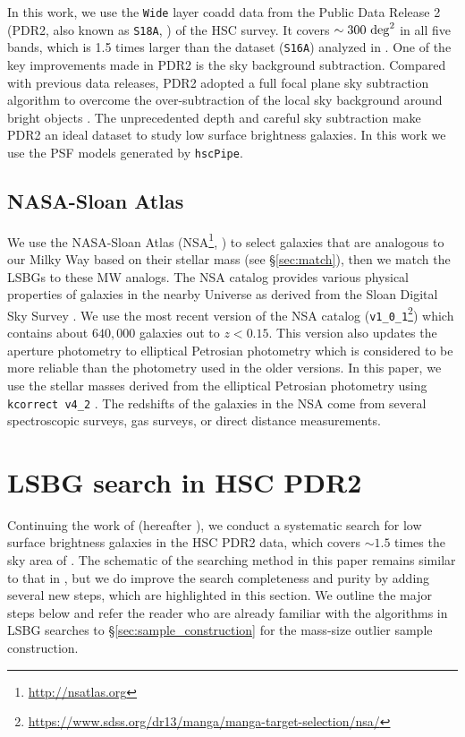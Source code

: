 \documentclass[twocolumn,astrosymb,twocolappendix]{aastex631}
\newcommand{\code}[1]{\texttt{#1}}
\begin{document}
\begin{CJK*}{UTF8}{gbsn}
In this work, we use the \code{Wide} layer coadd data from the Public Data Release 2 (PDR2, also known as \code{S18A}, \citealt{Aihara2018}) of the HSC survey. It covers $\sim 300\ \rm{deg}^2$ in all five bands, which is 1.5 times larger than the dataset (\code{S16A}) analyzed in \citet{Greco2018}. One of the key improvements made in PDR2 is the sky background subtraction. Compared with previous data releases, PDR2 adopted a full focal plane sky subtraction algorithm to overcome the over-subtraction of the local sky background around bright objects \citep{Aihara2018,Li2021}. The unprecedented depth and careful sky subtraction make PDR2 an ideal dataset to study low surface brightness galaxies. In this work we use the PSF models generated by \code{hscPipe}. 


\subsection{NASA-Sloan Atlas}
We use the NASA-Sloan Atlas (NSA\footnote{\url{http://nsatlas.org}}, \citealt{Blanton2005,Blanton2011}) to select galaxies that are analogous to our Milky Way based on their stellar mass (see \S\ref{sec:match}), then we match the LSBGs to these MW analogs. The NSA catalog provides various physical properties of galaxies in the nearby Universe as derived from the Sloan Digital Sky Survey \citep[SDSS,][]{York2000}. We use the most recent version of the NSA catalog (\code{v1\_0\_1}\footnote{\url{https://www.sdss.org/dr13/manga/manga-target-selection/nsa/}}) which contains about $640,000$ galaxies out to $z < 0.15$. This version also updates the aperture photometry to elliptical Petrosian photometry which is considered to be more reliable than the photometry used in the older versions. In this paper, we use the stellar masses derived from the elliptical Petrosian photometry using \code{kcorrect v4\_2} \citep{Blanton2007}. The redshifts of the galaxies in the NSA come from several spectroscopic surveys,  gas surveys, or direct distance measurements. 

\section{LSBG search in HSC PDR2}\label{sec:lsbg_search}

Continuing the work of \citet{Greco2018} (hereafter ), we conduct a systematic search for low surface brightness galaxies in the HSC PDR2 data, which covers $\sim 1.5$ times the sky area of . The schematic of the searching method in this paper remains similar to that in , but we do improve the search completeness and purity by adding several new steps, which are highlighted in this section. We outline the major steps below and refer the reader who are already familiar with the algorithms in LSBG searches to \S \ref{sec:sample_construction} for the mass-size outlier sample construction.


\end{CJK*}
\end{document}
